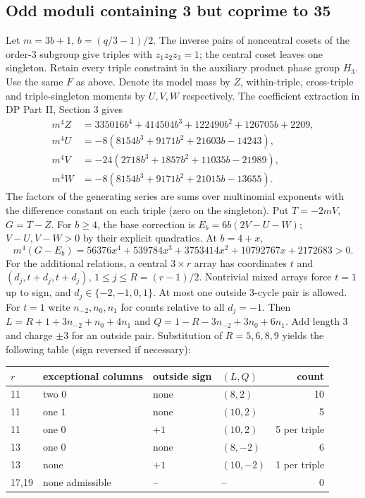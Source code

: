 \documentclass[11pt]{article}
\begin{document}
\subsection{Odd moduli containing 3 but coprime to 35}
Let $m=3b+1$, $b=(q/3-1)/2$. The inverse pairs of noncentral cosets of the order-3 subgroup give triples with $z_1z_2z_3=1$; the central coset leaves one singleton. Retain every triple constraint in the auxiliary product phase group $H_3$. Use the same $F$ as above. Denote its model mass by $Z$, within-triple, cross-triple and triple-singleton moments by $U,V,W$ respectively. The coefficient extraction in DP Part II, Section 3 gives
\begin{align*}m^4 Z&=335016b^4+414504b^3+122490b^2+126705b+2209,\\m^4 U&=-8(8154b^3+9171b^2+21603b-14243),\\m^4 V&=-24(2718b^3+1857b^2+11035b-21989),\\m^4 W&=-8(8154b^3+9171b^2+21015b-13655).
\end{align*}
The factors of the generating series are sums over multinomial exponents with the difference constant on each triple (zero on the singleton). Put $T=-2mV$, $G=T-Z$. For $b\ge4$, the base correction is $E_b=6b(2V-U-W)$; $V-U,V-W>0$ by their explicit quadratics. At $b=4+x$,
\[m^4(G-E_b)=56376x^4+539784x^3+3753414x^2+10792767x+2172683>0.\]
For the additional relations, a central $3\times r$ array has coordinates $t$ and $(d_j,t+d_j,t+d_j)$, $1\le j\le R=(r-1)/2$. Nontrivial mixed arrays force $t=1$ up to sign, and $d_j\in\{-2,-1,0,1\}$. At most one outside 3-cycle pair is allowed. For $t=1$ write $n_{-2},n_0,n_1$ for counts relative to all $d_j=-1$. Then $L=R+1+3n_{-2}+n_0+4n_1$ and $Q=1-R-3n_{-2}+3n_0+6n_1$. Add length 3 and charge $\pm3$ for an outside pair. Substitution of $R=5,6,8,9$ yields the following table (sign reversed if necessary):
\begin{center}\small\begin{tabular}{llllr}\toprule $r$ & exceptional columns & outside sign & $(L,Q)$ & count\\\midrule 11 & two $0$ & none & $(8,2)$ & 10\\11 & one $1$ & none & $(10,2)$ & 5\\11 & one $0$ & $+1$ & $(10,2)$ & 5 per triple\\13 & one $0$ & none & $(8,-2)$ & 6\\13 & none & $+1$ & $(10,-2)$ & 1 per triple\\17,19 & none admissible & -- & -- & 0\\\bottomrule\end{tabular}\end{center}
\end{document}
